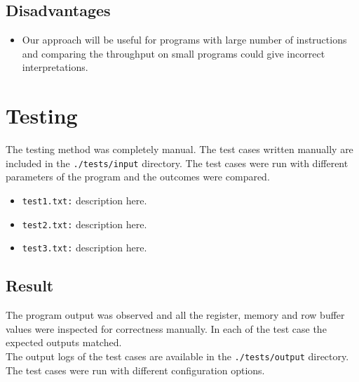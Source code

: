 \documentclass[hidelinks,12pt]{article}
\begin{document}
\subsection{Disadvantages}
\begin{itemize}
    \item Our approach will be useful for programs with large number of instructions and comparing the throughput on small programs could give incorrect interpretations.
\end{itemize}
\section{Testing}

The testing method was completely manual. The test cases written manually are included in the \verb|./tests/input| directory. The test cases were run with different parameters
of the program and the outcomes were compared.
\begin{itemize}
    \item \verb|test1.txt:| description here.
    \item \verb|test2.txt:| description here.
    \item \verb|test3.txt:| description here.
\end{itemize}

\subsection{Result}
The program output was observed and all the register, memory and row buffer values were inspected for correctness manually. In each of the test case the expected outputs matched.\\[0.2cm]
The output logs of the test cases are available in the \verb|./tests/output| directory. The test cases were run with different configuration options.
\end{document}

